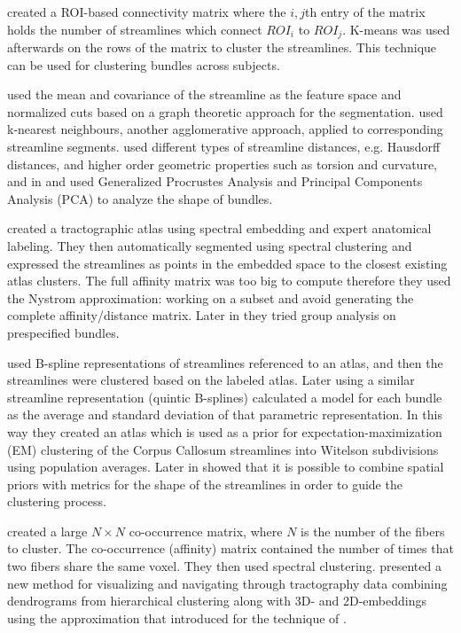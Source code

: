 \documentclass{bioinfo}
\begin{document}
 created a ROI-based connectivity matrix where the
$i,j$th entry of the matrix holds the number of streamlines which
connect $ROI_{i}$ to $ROI_{j}$. K-means was used afterwards on the rows
of the matrix to cluster the streamlines. This technique can be used for
clustering bundles across subjects.

\citet{brun2004clustering} used the mean and covariance of the
streamline as the feature space and normalized cuts based on a graph
theoretic approach for the segmentation. \citet{Ding2003a} used
k-nearest neighbours, another agglomerative approach, applied to
corresponding streamline segments. \citet{corouge2004towards} used
different types of streamline distances, e.g. Hausdorff distances, and
higher order geometric properties such as torsion and curvature, and in
\citet{Corouge2004} and \citet{Corouge2006} used Generalized Procrustes
Analysis and Principal Components Analysis (PCA) to analyze the shape of
bundles.

\citet{ODonnell_IEEETMI07} created a tractographic atlas using spectral
embedding and expert anatomical labeling. They then automatically
segmented using spectral clustering and expressed the streamlines as
points in the embedded space to the closest existing atlas clusters. The
full affinity matrix was too big to compute therefore they used the
Nystrom approximation: working on a subset and avoid generating the
complete affinity/distance matrix. Later in \citet{o2009tract} they
tried group analysis on prespecified bundles.

\citet{Maddah_MICCA2005} used B-spline representations of streamlines
referenced to an atlas, and then the streamlines were clustered based on
the labeled atlas. Later \citet{maddah2006statistical} using a similar
streamline representation (quintic B-splines) calculated a model for
each bundle as the average and standard deviation of that parametric
representation. In this way they created an atlas which is used as a
prior for expectation-maximization (EM) clustering of the Corpus
Callosum streamlines into Witelson subdivisions \citep{witelson1989hand}
using population averages. Later in \citet{Maddah_IEEEBI2008} showed
that it is possible to combine spatial priors with metrics for the shape
of the streamlines in order to guide the clustering process.

\citet{jonasson2005fiber} created a large $N\times N$ co-occurrence
matrix, where $N$ is the number of the fibers to cluster.  The
co-occurrence (affinity) matrix contained the number of times that two
fibers share the same voxel. They then used spectral clustering.
\citet{jianu2009exploring} presented a new method for visualizing and
navigating through tractography data combining dendrograms from
hierarchical clustering along with 3D- and 2D-embeddings using the
approximation that \citet{chalmers1996linear} introduced for the
technique of \citet{eades1984heuristic}.
\end{document}
